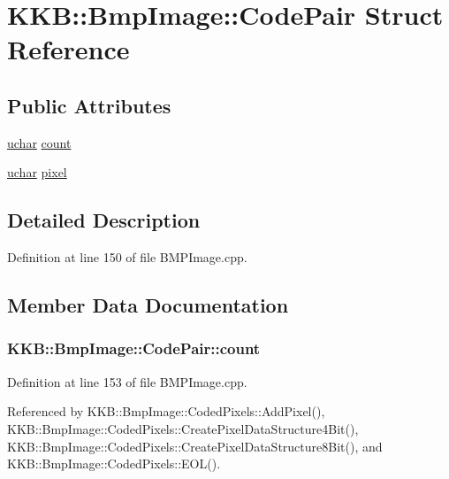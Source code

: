 \hypertarget{struct_bmp_image_1_1_code_pair}{}\section{K\+KB\+:\+:Bmp\+Image\+:\+:Code\+Pair Struct Reference}
\label{struct_bmp_image_1_1_code_pair}
\subsection*{Public Attributes}
\begin{DoxyCompactItemize}
\item 
\hyperlink{namespace_k_k_b_ace9969169bf514f9ee6185186949cdf7}{uchar} \hyperlink{struct_bmp_image_1_1_code_pair_a1501fa5638588a3a7afdbbfb62327dae}{count}
\item 
\hyperlink{namespace_k_k_b_ace9969169bf514f9ee6185186949cdf7}{uchar} \hyperlink{struct_bmp_image_1_1_code_pair_ac341a7d727f931dc9c446eb1d67fe022}{pixel}
\end{DoxyCompactItemize}


\subsection{Detailed Description}


Definition at line 150 of file B\+M\+P\+Image.\+cpp.



\subsection{Member Data Documentation}
\subsubsection[{\texorpdfstring{count}{count}}]{ K\+K\+B\+::\+Bmp\+Image\+::\+Code\+Pair\+::count}\hypertarget{struct_bmp_image_1_1_code_pair_a1501fa5638588a3a7afdbbfb62327dae}{}\label{struct_bmp_image_1_1_code_pair_a1501fa5638588a3a7afdbbfb62327dae}


Definition at line 153 of file B\+M\+P\+Image.\+cpp.



Referenced by K\+K\+B\+::\+Bmp\+Image\+::\+Coded\+Pixels\+::\+Add\+Pixel(), K\+K\+B\+::\+Bmp\+Image\+::\+Coded\+Pixels\+::\+Create\+Pixel\+Data\+Structure4\+Bit(), K\+K\+B\+::\+Bmp\+Image\+::\+Coded\+Pixels\+::\+Create\+Pixel\+Data\+Structure8\+Bit(), and K\+K\+B\+::\+Bmp\+Image\+::\+Coded\+Pixels\+::\+E\+O\+L().

